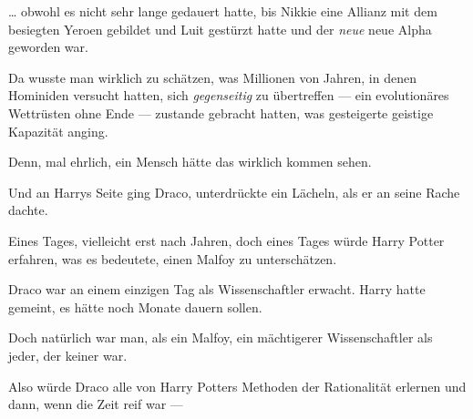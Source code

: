… obwohl es nicht sehr lange gedauert hatte, bis Nikkie eine Allianz mit dem besiegten Yeroen gebildet und Luit gestürzt hatte und der \emph{neue} neue Alpha geworden war.

Da wusste man wirklich zu schätzen, was Millionen von Jahren, in denen Hominiden versucht hatten, sich \emph{gegenseitig} zu übertreffen — ein evolutionäres Wettrüsten ohne Ende — zustande gebracht hatten, was gesteigerte geistige Kapazität anging.

Denn, mal ehrlich, ein Mensch hätte das wirklich kommen sehen.

\later

Und an Harrys Seite ging Draco, unterdrückte ein Lächeln, als er an seine Rache dachte.

Eines Tages, vielleicht erst nach Jahren, doch eines Tages würde Harry Potter erfahren, was es bedeutete, einen Malfoy zu unterschätzen.

Draco war an einem einzigen Tag als Wissenschaftler erwacht. Harry hatte gemeint, es hätte noch Monate dauern sollen.

Doch natürlich war man, als ein Malfoy, ein mächtigerer Wissenschaftler als jeder, der keiner war.

Also würde Draco alle von Harry Potters Methoden der Rationalität erlernen und dann, wenn die Zeit reif war —


